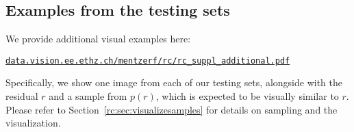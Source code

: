 \begin{subappendices}
\section{Examples from the testing sets}\label{rc:sec:testsetexamples}

We provide additional visual examples here: 

    {\small \href{https://data.vision.ee.ethz.ch/mentzerf/rc/rc_suppl_additional.pdf}{%
        \texttt{data.vision.ee.ethz.ch/mentzerf/rc/rc\_suppl\_additional.pdf}}}

Specifically, we show one image from each of our testing sets, alongside with the residual $r$ and a sample from $p(r)$, which is expected to be visually similar to $r$. Please refer to Section~\ref{rc:sec:visualizesamples} for details on sampling and the visualization.

\end{subappendices} 

